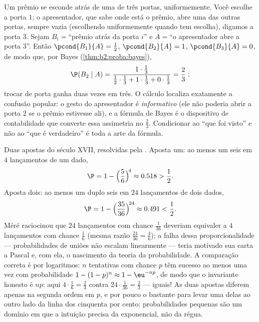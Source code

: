 \begin{example}\label{ex:b2:proba:montyhall}
Um prêmio se esconde atrás de uma de três portas, uniformemente. Você escolhe
a porta $1$; o apresentador, que sabe onde está o prêmio, abre uma das
outras portas, sempre vazia (escolhendo uniformemente quando tem
escolha), digamos a porta $3$. Sejam $B_i = {}$``prêmio atrás da porta
$i$'' e $A = {}$``o apresentador abre a porta $3$''. Então
$\pcond{B_1}{A} = \frac12$, $\pcond{B_2}{A} = 1$,
$\pcond{B_3}{A} = 0$, de modo que, por Bayes
(\cref{thm:b2:proba:bayes}),
\[
\P(B_2 \mid A)
= \frac{1\cdot\frac13}
{\frac12\cdot\frac13 + 1\cdot\frac13 + 0\cdot\frac13}
= \frac23 :
\]
trocar de porta ganha duas vezes em três. O cálculo
localiza exatamente a confusão popular: o gesto do apresentador é
\emph{informativo} (ele não poderia abrir a porta $2$ se o prêmio
estivesse ali), e a fórmula de Bayes é o dispositivo de contabilidade
que converte essa assimetria no $\frac23$. Condicionar
ao ``que foi visto'' e não ao ``que é verdadeiro'' é toda
a arte da fórmula.
\end{example}

\begin{example}\label{ex:b2:proba:demere}
Duas apostas do século XVII, resolvidas pela . Aposta
um: ao menos um seis em $4$ lançamentos de um dado,
\[
\P = 1 - \Bigl(\frac56\Bigr)^{\!4} \approx 0.518 > \frac12 .
\]
Aposta dois: ao menos um duplo seis em $24$ lançamentos de dois dados,
\[
\P = 1 - \Bigl(\frac{35}{36}\Bigr)^{\!24} \approx 0.491 <
\frac12 .
\]
Méré raciocinou que $24$ lançamentos com chance $\frac1{36}$
deveriam equivaler a $4$ lançamentos com chance $\frac16$ (mesma razão
$\frac{24}{36} = \frac46$); a falha dessa
proporcionalidade --- probabilidades de uniões não escalam
linearmente --- teria motivado sua carta a Pascal
e, com ela, o nascimento da teoria da probabilidade.
A comparação correta é por logaritmos: $n$ tentativas com chance $p$
têm sucesso ao menos uma vez com probabilidade $1 - (1-p)^n \approx
1 - \eu^{-np}$, de modo que o invariante honesto é $np$: aqui
$4\cdot\frac16 = \frac23$ contra $24\cdot\frac1{36} =
\frac23$ --- iguais! As duas apostas diferem apenas na segunda
ordem em $p$, e por pouco o bastante para levar uma delas ao outro lado da
linha dos cinquenta por cento: probabilidades pequenas são um domínio em que
a intuição precisa da exponencial, não da régua.
\end{example}

